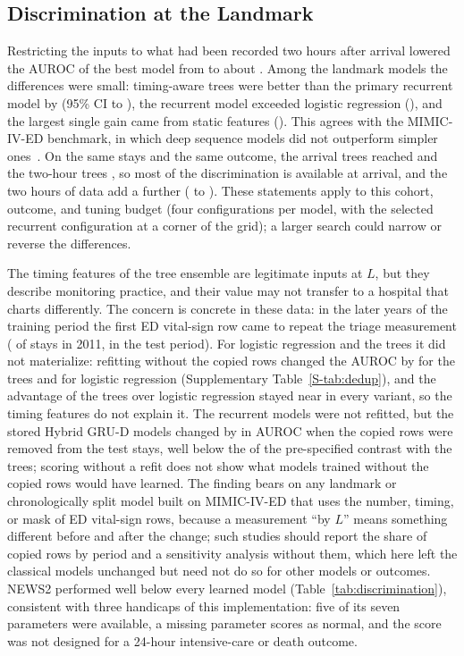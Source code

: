 \subsection{Discrimination at the Landmark}

Restricting the inputs to what had been recorded two hours after arrival lowered the AUROC of the best model from \RVEosHybridAuroc{} to about \RVAurocXgbT{}. Among the landmark models the differences were small: timing-aware trees
were better than the primary recurrent model by \RVTreesOverHybrid{} (95\% CI \RVTreesOverHybridLo{} to \RVTreesOverHybridHi{}), the recurrent model exceeded logistic regression (\RVCTwoDelta{}), and the largest single gain came from
static features (\RVCThreeDelta{}). This agrees with the MIMIC-IV-ED benchmark, in which deep sequence models did not outperform simpler ones~\cite{xie2022mimic4ed}. On the same stays and the same outcome, the arrival trees reached \RVCommonArrTrees{} and the two-hour trees \RVCommonTwoTrees{}, so most of the discrimination is
available at arrival, and the two hours of data add a further \RVCommonTreesGainU{} (\RVCommonTreesGainULo{} to \RVCommonTreesGainUHi{}). These statements apply to
this cohort, outcome, and tuning budget (four configurations per model, with the selected recurrent configuration at a corner of the grid); a larger search could narrow or reverse the differences.

The timing features of the tree ensemble are legitimate inputs at $L$, but they describe monitoring practice, and their value may not transfer to a hospital that charts differently. The concern is concrete in these data: in the later years of the training period the first ED vital-sign row came to repeat the triage measurement (\RVRecEqTriC{} of stays in 2011, \RVRecEqTriTest{} in the test period). For logistic regression and the trees it did not materialize: refitting without the copied rows changed the AUROC by \RVDdTreesChange{} for the trees and \RVDdLrChange{} for logistic regression (Supplementary Table~\ref{S-tab:dedup}), and the advantage of the trees over logistic regression stayed near \RVOrigTreesOverLr{} in every variant, so the timing features do not explain it. The recurrent models were not refitted, but the stored Hybrid GRU-D models changed by \RVGrudHybridChange{} in AUROC when the copied rows were removed from the test stays, well below the \RVCOneDelta{} of the pre-specified contrast with the trees; scoring without a refit does not show what models trained without the copied rows would have learned. The finding bears on any landmark or chronologically split model built on MIMIC-IV-ED that uses the number, timing, or mask of ED vital-sign rows, because a measurement ``by $L$'' means something different before and after the change; such studies should report the share of copied rows by period and a sensitivity analysis without them, which here left the classical models unchanged but need not do so for other models or outcomes. NEWS2 performed well below every learned model (Table~\ref{tab:discrimination}), consistent with three handicaps of this implementation: five of its seven parameters were available, a missing parameter scores as normal, and the score was not designed for a 24-hour intensive-care or death outcome.


